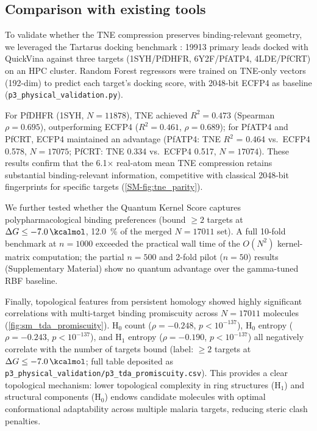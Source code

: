 \documentclass[11pt,a4paper]{article}
\begin{document}
\subsection{Comparison with existing tools}

To validate whether the TNE compression preserves binding-relevant geometry, we leveraged the Tartarus docking benchmark \citep{tartarus_2024}: \num{19913} primary leads docked with QuickVina against three targets (1SYH/PfDHFR, 6Y2F/PfATP4, 4LDE/PfCRT) on an HPC cluster. Random Forest regressors were trained on TNE-only vectors (\num{192}-dim) to predict each target's docking score, with \num{2048}-bit ECFP4 as baseline (\texttt{p3\_physical\_validation.py}).

For PfDHFR (1SYH, $N = \num{11878}$), TNE achieved $R^2 = \num{0.473}$ (Spearman $\rho = \num{0.695}$), outperforming ECFP4 ($R^2 = \num{0.461}$, $\rho = \num{0.689}$); for PfATP4 and PfCRT, ECFP4 maintained an advantage (PfATP4: TNE $R^2$ = \num{0.464} vs.\ ECFP4 \num{0.578}, $N = \num{17075}$; PfCRT: TNE \num{0.334} vs.\ ECFP4 \num{0.517}, $N = \num{17074}$). These results confirm that the \num{6.1}$\times$ real-atom mean TNE compression retains substantial binding-relevant information, competitive with classical \num{2048}-bit fingerprints for specific targets (\cref{SM-fig:tne_parity}).

We further tested whether the Quantum Kernel Score captures polypharmacological binding preferences (bound $\geq 2$ targets at $\Delta G \leq -\SI{7.0}{\kcalmol}$, \qty{12.0}{\percent} of the merged $N=\num{17011}$ set). A full 10-fold benchmark at $n=\num{1000}$ exceeded the practical wall time of the $O(N^2)$ kernel-matrix computation; the partial $n=500$ and 2-fold pilot ($n=50$) results (Supplementary Material) show no quantum advantage over the gamma-tuned RBF baseline.

Finally, topological features from persistent homology showed highly significant correlations with multi-target binding promiscuity across $N = \num{17011}$ molecules (\cref{fig:sm_tda_promiscuity}). H$_0$ count ($\rho = -\num{0.248}$, $p < 10^{-137}$), H$_0$ entropy ($\rho = -\num{0.243}$, $p < 10^{-137}$), and H$_1$ entropy ($\rho = -\num{0.190}$, $p < 10^{-137}$) all negatively correlate with the number of targets bound (label: $\geq 2$ targets at $\Delta G \leq -\SI{7.0}{\kcalmol}$; full table deposited as \texttt{p3\_physical\_validation/p3\_tda\_promiscuity.csv}). This provides a clear topological mechanism: lower topological complexity in ring structures (H$_1$) and structural components (H$_0$) endows candidate molecules with optimal conformational adaptability across multiple malaria targets, reducing steric clash penalties.
\end{document}

